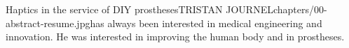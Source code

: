 

 
\begin{thesis}{Haptics in the service of DIY prostheses}{TRISTAN JOURNEL}{chapters/00-abstract-resume}{.jpg}{has always been interested in medical engineering and innovation. He was interested in improving the human body and in prostheses.}   
    
    
    
     
    
\end{thesis}


